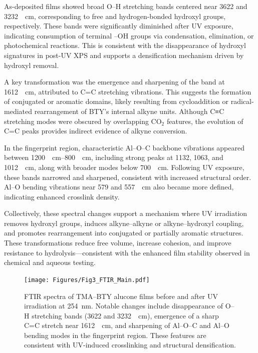 As-deposited films showed broad O–H stretching bands centered near 3622 and 3232~\si{\per\centi\meter}, corresponding to free and hydrogen-bonded hydroxyl groups, respectively. These bands were significantly diminished after UV exposure, indicating consumption of terminal –OH groups via condensation, elimination, or photochemical reactions. This is consistent with the disappearance of hydroxyl signatures in post-UV XPS and supports a densification mechanism driven by hydroxyl removal.

A key transformation was the emergence and sharpening of the band at \SI{1612}{\per\centi\meter}, attributed to C=C stretching vibrations. This suggests the formation of conjugated or aromatic domains, likely resulting from cycloaddition or radical-mediated rearrangement of BTY’s internal alkyne units. Although C≡C stretching modes were obscured by overlapping CO$_2$ features, the evolution of C=C peaks provides indirect evidence of alkyne conversion.

In the fingerprint region, characteristic Al–O–C backbone vibrations appeared between \SIrange{1200}{800}{\per\centi\meter}, including strong peaks at 1132, 1063, and 1012~\si{\per\centi\meter}, along with broader modes below 700~\si{\per\centi\meter}. Following UV exposure, these bands narrowed and sharpened, consistent with increased structural order. Al–O bending vibrations near 579 and 557~\si{\per\centi\meter} also became more defined, indicating enhanced crosslink density.

Collectively, these spectral changes support a mechanism where UV irradiation removes hydroxyl groups, induces alkyne–alkyne or alkyne–hydroxyl coupling, and promotes rearrangement into conjugated or partially aromatic structures. These transformations reduce free volume, increase cohesion, and improve resistance to hydrolysis—consistent with the enhanced film stability observed in chemical and aqueous testing.

\begin{figure}[ht]
  \centering
  \texttt{[image: Figures/Fig3\_FTIR\_Main.pdf]}
  \caption{FTIR spectra of TMA–BTY alucone films before and after UV irradiation at 254~nm. Notable changes include disappearance of O–H stretching bands (3622 and 3232~\si{\per\centi\meter}), emergence of a sharp C=C stretch near 1612~\si{\per\centi\meter}, and sharpening of Al–O–C and Al–O bending modes in the fingerprint region. These features are consistent with UV-induced crosslinking and structural densification.}
  \label{fig:ftir}
\end{figure}

